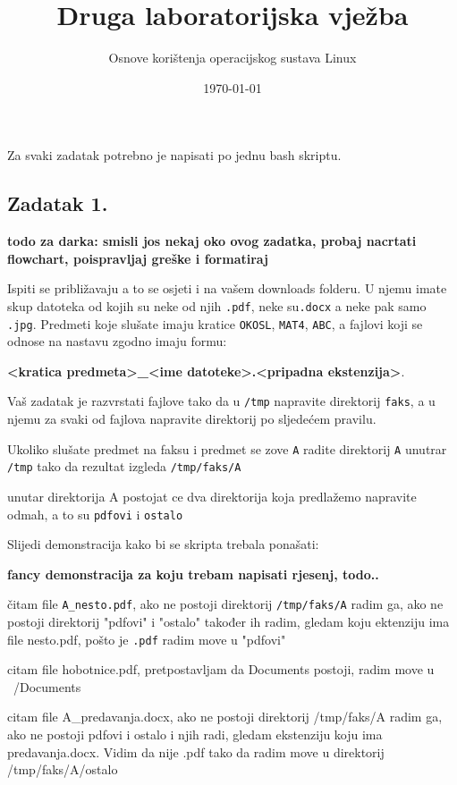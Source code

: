 \documentclass{exam}
\title{Druga laboratorijska vježba}
\author{Osnove korištenja operacijskog sustava Linux}
\date{\today}
\newcommand{\shell}[1]{\texttt{#1}}
\begin{document}
\maketitle
Za svaki zadatak potrebno je napisati po jednu bash skriptu.

\subsection*{Zadatak 1.} 

\textbf{todo za darka: smisli jos nekaj oko ovog zadatka, probaj nacrtati flowchart, poispravljaj greške i formatiraj}

Ispiti se približavaju a to se osjeti i na vašem downloads folderu. U njemu imate skup datoteka od kojih su neke od njih \shell{.pdf}, neke su\shell{.docx} a neke pak samo \shell{.jpg}. Predmeti koje slušate imaju kratice \shell{OKOSL}, \shell{MAT4}, \shell{ABC}, a fajlovi koji se odnose na nastavu zgodno imaju formu: 


\textbf{\textless kratica predmeta\textgreater \_\textless ime datoteke\textgreater .\textless pripadna ekstenzija\textgreater}.

Vaš zadatak je razvrstati fajlove tako da u \shell{/tmp} napravite direktorij \shell{faks}, a u njemu za svaki od fajlova napravite direktorij po sljedećem pravilu.

Ukoliko slušate predmet na faksu i predmet se zove \shell{A} radite direktorij \shell{A} unutrar \shell{/tmp} tako da rezultat izgleda \shell{/tmp/faks/A}

unutar direktorija A postojat ce dva direktorija koja predlažemo napravite odmah, a to su \shell{pdfovi} i \shell{ostalo}

Slijedi demonstracija kako bi se skripta trebala ponašati:

\textbf{fancy demonstracija za koju trebam napisati rjesenj, todo..}

čitam file \shell{A\_nesto.pdf}, ako ne postoji direktorij \shell{/tmp/faks/A} radim ga, ako ne postoji direktorij "pdfovi" i "ostalo" također ih radim, gledam koju ektenziju ima file nesto.pdf, pošto je \shell{.pdf} radim move u "pdfovi"

citam file hobotnice.pdf, pretpostavljam da Documents postoji, radim move u ~/Documents

citam file A\_predavanja.docx, ako ne postoji direktorij /tmp/faks/A radim ga, ako ne postoji pdfovi i ostalo i njih radi, gledam ekstenziju koju ima predavanja.docx. Vidim da nije .pdf tako da radim move u direktorij /tmp/faks/A/ostalo
\end{document}
